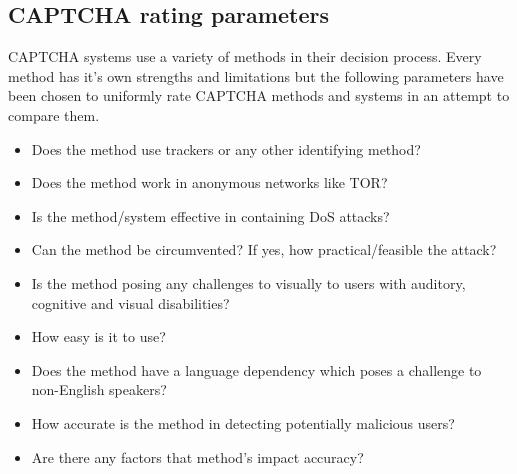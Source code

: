 \subsection{CAPTCHA rating parameters}
CAPTCHA systems use a variety of methods in their decision process. Every method
has it's own strengths and limitations but the following parameters have been
chosen to uniformly rate CAPTCHA methods and systems in an attempt to compare
them.
\begin{description}
\item[Privacy] 
	\begin{itemize}
		\item Does the method use trackers or any other identifying method?
		\item Does the method work in anonymous networks like TOR?\
	\end{itemize}
\item[Effectiveness]
	\begin{itemize}
		\item Is the method/system effective in containing DoS attacks? 
		\item Can the method be circumvented? If yes, how practical/feasible
		the attack?

	\end{itemize}
\item[Accessibility]
	\begin{itemize}
		\item Is the method posing any challenges to visually to users
			with auditory, cognitive and visual disabilities? 
		\item How easy is it to use?
		\item Does the method have a language dependency which poses a challenge to
		non-English speakers?
	\end{itemize}
\item[Accuracy]
	\begin{itemize}
		\item How accurate is the method in detecting potentially malicious
			users?
		\item Are there any factors that method's impact accuracy?
	\end{itemize}
\end{description}
